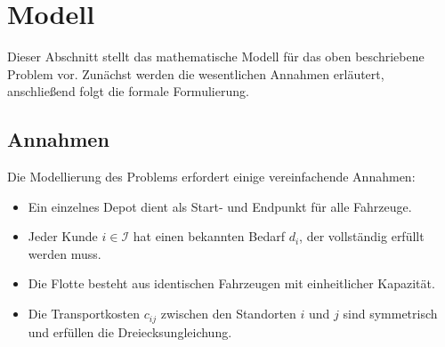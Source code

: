 \documentclass[11pt,a4paper]{article}
\begin{document}
\section{Modell}
\label{sec:modell}
Dieser Abschnitt stellt das mathematische Modell für das oben beschriebene Problem vor. Zunächst werden die wesentlichen Annahmen erläutert, anschließend folgt die formale Formulierung.

\subsection{Annahmen}
\label{sec:annahmen}
Die Modellierung des Problems erfordert einige vereinfachende Annahmen:
\begin{itemize}
	\item Ein einzelnes Depot dient als Start- und Endpunkt für alle Fahrzeuge.
	\item Jeder Kunde $i \in \mathcal{I}$ hat einen bekannten Bedarf $d_i$, der vollständig erfüllt werden muss.
	\item Die Flotte besteht aus identischen Fahrzeugen mit einheitlicher Kapazität.
	\item Die Transportkosten $c_{ij}$ zwischen den Standorten $i$ und $j$ sind symmetrisch und erfüllen die Dreiecksungleichung.
\end{itemize}

%
\end{document}
